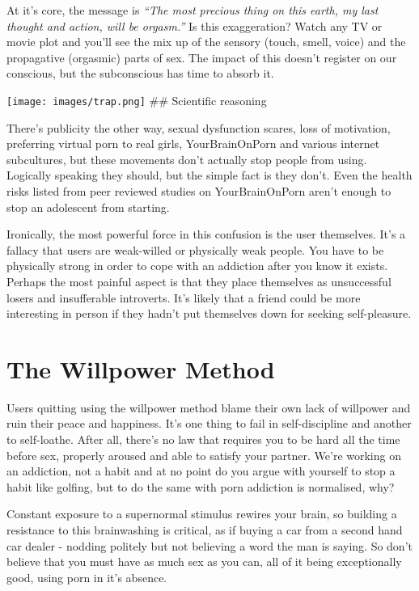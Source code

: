 \documentclass[
]{book}
\begin{document}
At it's core, the message is \emph{``The most precious thing on this earth, my last thought and action, will be orgasm.''} Is this exaggeration? Watch any TV or movie plot and you'll see the mix up of the sensory (touch, smell, voice) and the propagative (orgasmic) parts of sex. The impact of this doesn't register on our conscious, but the subconscious has time to absorb it.

\texttt{[image: images/trap.png]}
\#\# Scientific reasoning

There's publicity the other way, sexual dysfunction scares, loss of motivation, preferring virtual porn to real girls, YourBrainOnPorn and various internet subcultures, but these movements don't actually stop people from using. Logically speaking they should, but the simple fact is they don't. Even the health risks listed from peer reviewed studies on YourBrainOnPorn aren't enough to stop an adolescent from starting.

Ironically, the most powerful force in this confusion is the user themselves. It's a fallacy that users are weak-willed or physically weak people. You have to be physically strong in order to cope with an addiction after you know it exists. Perhaps the most painful aspect is that they place themselves as unsuccessful losers and insufferable introverts. It's likely that a friend could be more interesting in person if they hadn't put themselves down for seeking self-pleasure.

\hypertarget{the-willpower-method}{%
\section{The Willpower Method}\label{the-willpower-method}}

Users quitting using the willpower method blame their own lack of willpower and ruin their peace and happiness. It's one thing to fail in self-discipline and another to self-loathe. After all, there's no law that requires you to be hard all the time before sex, properly aroused and able to satisfy your partner. We're working on an addiction, not a habit and at no point do you argue with yourself to stop a habit like golfing, but to do the same with porn addiction is normalised, why?

Constant exposure to a supernormal stimulus rewires your brain, so building a resistance to this brainwashing is critical, as if buying a car from a second hand car dealer - nodding politely but not believing a word the man is saying. So don't believe that you must have as much sex as you can, all of it being exceptionally good, using porn in it's absence.
\end{document}
